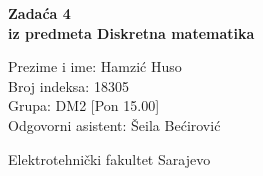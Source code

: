 \documentclass[12pt]{article}
\newcommand{\prezimeIme}{Hamzić Huso}
\newcommand{\brIndexa}{18305}
\newcommand{\brZadace}{4}
\newcommand{\grupa}{DM2 [Pon 15.00]}
\newcommand{\demos}{Šeila Bećirović}
\begin{document}
    
    \thispagestyle{empty}
    \begin{center}
      \vspace*{1cm}

      \vspace*{2cm}
      {\huge \bf Zadaća \brZadace } \\
      \vspace*{1cm}
      {\Large \bf iz predmeta Diskretna matematika}

      \vspace*{2cm}

      {\Large Prezime i ime: \prezimeIme} \\
      \vspace*{0.75cm}
      {\Large Broj indeksa: \brIndexa} \\
      \vspace*{0.75cm}
      {\Large Grupa: \grupa} \\
      \vspace*{0.75cm}
      {\Large Odgovorni asistent: \demos} \\
      \vspace*{2cm}
      \renewcommand{\arraystretch}{1.75}
      \vfill


      {\large Elektrotehnički fakultet Sarajevo}

    \end{center}
    \newpage
    \thispagestyle{empty}
    
\end{document}
